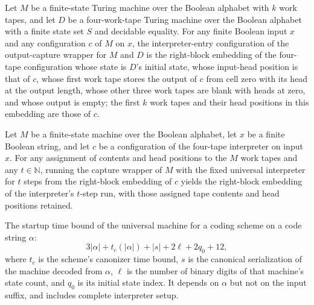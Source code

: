 \begin{lemma}
\label{Turing.universalCaptured_right}
\leanok
{}
Let $M$ be a finite-state Turing machine over the Boolean alphabet with $k$ work tapes,
and let $D$ be a four-work-tape Turing machine over the Boolean alphabet with a finite
state set $S$ and decidable equality. For any finite Boolean input $x$ and any
configuration $c$ of $M$ on $x$, the interpreter-entry configuration of the
output-capture wrapper for $M$ and $D$ is the right-block embedding of the four-tape
configuration whose state is $D$’s initial state, whose input-head position is that of
$c$, whose first work tape stores the output of $c$ from cell zero with its head at the
output length, whose other three work tapes are blank with heads at zero, and whose
output is empty; the first $k$ work tapes and their head positions in this embedding are
those of $c$.
\end{lemma}

\begin{lemma}
\label{Turing.universalCapture_interpreter_run}
\leanok
{}
Let $M$ be a finite-state machine over the Boolean alphabet, let $x$ be a finite Boolean
string, and let $c$ be a configuration of the four-tape interpreter on input $x$. For
any assignment of contents and head positions to the $M$ work tapes and any
$t\in\mathbb{N}$, running the capture wrapper of $M$ with the fixed universal
interpreter for $t$ steps from the right-block embedding of $c$ yields the right-block
embedding of the interpreter’s $t$-step run, with those assigned tape contents and head
positions retained.
\end{lemma}

\begin{definition}
\label{Turing.universalStartupBound}
\leanok
{}
The startup time bound of the universal machine for a coding scheme on a code
string $\alpha$:
\[
  3|\alpha| + t_c(|\alpha|) + |s| + 2\ell + 2 q_0 + 12,
\]
where $t_c$ is the scheme's canonizer time bound, $s$ is the canonical
serialization of the machine decoded from $\alpha$, $\ell$ is the number of
binary digits of that machine's state count, and $q_0$ is its initial state
index.  It depends on $\alpha$ but not on the input suffix, and includes
complete interpreter setup.
\end{definition}

